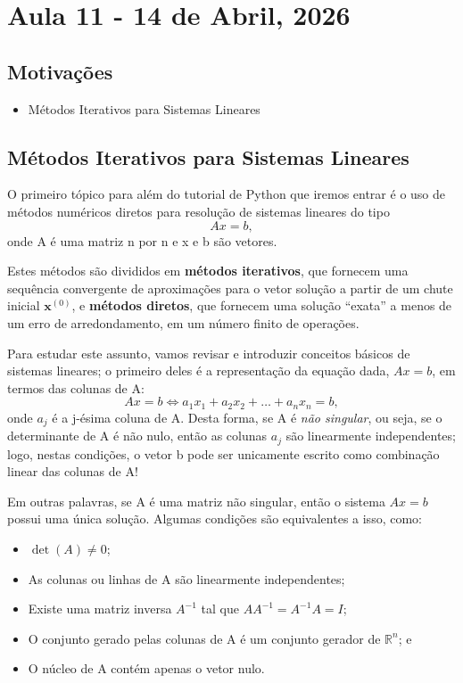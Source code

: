 \documentclass[../numerical_methods.tex]{subfiles}
\begin{document}
\section{Aula 11 - 14 de Abril, 2026}
\subsection{Motivações}
\begin{itemize}
	\item Métodos Iterativos para Sistemas Lineares
\end{itemize}
\subsection{Métodos Iterativos para Sistemas Lineares}
O primeiro tópico para além do tutorial de Python que iremos entrar é o uso de métodos numéricos diretos para resolução de sistemas lineares do tipo
\[
	Ax = b,
\]
onde A é uma matriz n por n e x e b são vetores.

Estes métodos são divididos em \textbf{métodos iterativos}, que fornecem uma sequência convergente de aproximações para o vetor solução a partir de um chute inicial \(\mathbf{x}^{(0)}\), e \textbf{métodos diretos}, que fornecem uma solução ``exata'' a menos de um erro de arredondamento, em um número finito de operações.

Para estudar este assunto, vamos revisar e introduzir conceitos básicos de sistemas lineares; o primeiro deles é a representação da equação dada, \(Ax=b\), em termos das colunas de A:
\[
	Ax = b \Longleftrightarrow a_1x_1+a_2x_2+\dotsc +a_{n}x_{n}=b,
\]
onde \(a_{j}\) é a j-ésima coluna de A. Desta forma, se A é \textit{não singular}, ou seja, se o determinante de A é não nulo, então as colunas \(a_{j}\) são linearmente independentes; logo, nestas condições, o vetor b pode ser unicamente escrito como combinação linear das colunas de A!

Em outras palavras, se A é uma matriz não singular, então o sistema \(Ax = b\) possui uma única solução. Algumas condições são equivalentes a isso, como:
\begin{itemize}
	\item[1)] \(\det{(A)}\neq 0\);
	\item[2)] As colunas ou linhas de A são linearmente independentes;
	\item[3)] Existe uma matriz inversa \(A^{-1}\) tal que \(AA^{-1}= A^{-1}A = I\);
	\item[4)] O conjunto gerado pelas colunas de A é um conjunto gerador de \(\mathbb{R}^{n}\); e
	\item[5)] O núcleo de A contém apenas o vetor nulo.
\end{itemize}
\end{document}

